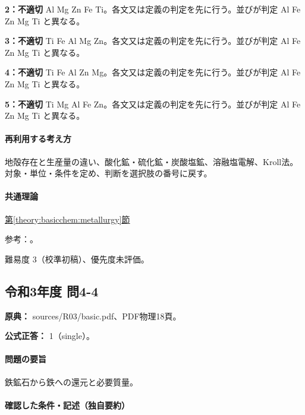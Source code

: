 \noindent\textbf{2：不適切} Al Mg Zn Fe Ti。各文又は定義の判定を先に行う。並びが判定 Al Fe Zn Mg Ti と異なる。\par

\noindent\textbf{3：不適切} Ti Fe Al Mg Zn。各文又は定義の判定を先に行う。並びが判定 Al Fe Zn Mg Ti と異なる。\par

\noindent\textbf{4：不適切} Ti Fe Al Zn Mg。各文又は定義の判定を先に行う。並びが判定 Al Fe Zn Mg Ti と異なる。\par

\noindent\textbf{5：不適切} Ti Mg Al Fe Zn。各文又は定義の判定を先に行う。並びが判定 Al Fe Zn Mg Ti と異なる。\par

\paragraph{再利用する考え方} 地殻存在と生産量の違い、酸化鉱・硫化鉱・炭酸塩鉱、溶融塩電解、Kroll法。 対象・単位・条件を定め、判断を選択肢の番号に戻す。

\paragraph{共通理論} \hyperref[theory:basicchem:metallurgy]{第\ref*{theory:basicchem:metallurgy}節}

\par 参考：\cite{chem55_kroll,chem55_crust}。

\par 難易度 3（校準初稿）、優先度未評価。

\subsection{令和3年度 問4-4}
\label{q:r03-reg-basic-4-4}

\noindent\textbf{原典：} sources/R03/basic.pdf、PDF物理18頁。

\textbf{公式正答：} 1（single）。

\paragraph{問題の要旨} 鉄鉱石から鉄への還元と必要質量。

\paragraph{確認した条件・記述（独自要約）}\mbox{}\par

